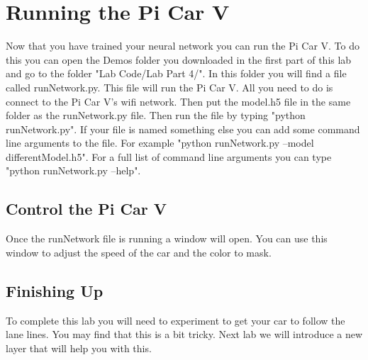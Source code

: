 \documentclass[11pt]{report}
\begin{document}
\chapter{Running the Pi Car V}
Now that you have trained your neural network you can run the Pi Car V. To do this you can open the Demos folder you downloaded in the first part of this lab and go to the folder "Lab Code/Lab Part 4/". In this folder you will find a file called runNetwork.py. This file will run the Pi Car V. All you need to do is connect to the Pi Car V's wifi network.
Then put the model.h5 file in the same folder as the runNetwork.py file. Then run the file by typing "python runNetwork.py". If your file is named something else you can add some command line arguments to the file. For example "python runNetwork.py --model differentModel.h5". For a full list of command line arguments you can type "python runNetwork.py --help".

\section{Control the Pi Car V}
Once the runNetwork file is running a window will open. You can use this window to adjust the speed of the car and the color to mask.

\section{Finishing Up}
To complete this lab you will need to experiment to get your car to follow the lane lines. You may find that this is a bit tricky. Next lab we will introduce a new layer that will help you with this.
\end{document}

